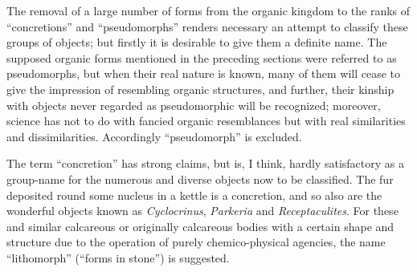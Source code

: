 \documentclass[a4paper, 12pt, oneside]{article}
\begin{document}
The removal of a large number of forms from the organic kingdom to the ranks of ``concretions'' and ``pseudomorphs'' renders necessary an attempt to classify these groups of objects; but firstly it is desirable to give them a definite name. The supposed organic forms mentioned in the preceding sections were referred to as pseudomorphs, but when their real nature is known, many of them will cease to give the impression of resembling organic structures, and further, their kinship with objects never regarded as pseudomorphic will be recognized; moreover, science has not to do with fancied organic resemblances but with real similarities and dissimilarities. Accordingly ``pseudomorph'' is excluded.

The term ``concretion'' has strong claims, but is, I think, hardly satisfactory as a group-name for the numerous and diverse objects now to be classified. The fur deposited round some nucleus in a kettle is a concretion, and so also are the wonderful objects known as \emph{Cyclocrinus}, \emph{Parkeria} and \emph{Receptaculites}. For these and similar calcareous or originally calcareous bodies with a certain shape and structure due to the operation of purely chemico-physical agencies, the name ``lithomorph'' (``forms in stone'') is suggested.
\end{document}
